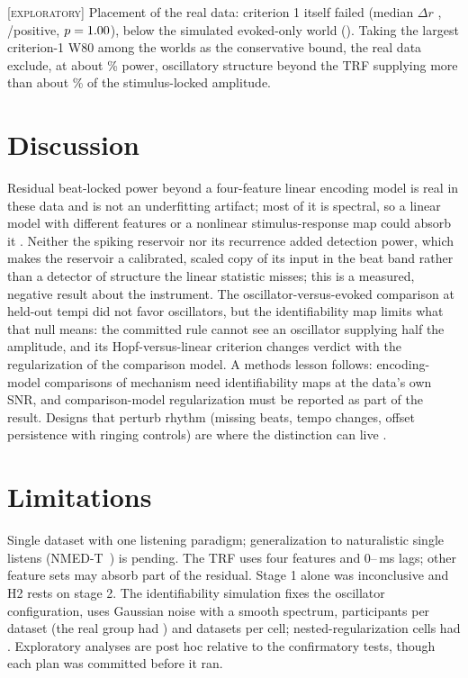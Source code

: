 \documentclass[journal]{IEEEtran}
\newcommand{\Expl}{\textsc{[exploratory]}\xspace}
\begin{document}
\Expl Placement of the real data: criterion 1 itself failed (median $\Delta r$ \NumRealDelta, \NumRealPos/\NumNTwo positive, $p=1.00$), below the simulated evoked-only world (\NumEvokedOnly). Taking the largest criterion-1 W80 among the worlds as the conservative bound, the real data exclude, at about \NumPowerPct\% power, oscillatory structure beyond the TRF supplying more than about \NumTierBPct\% of the stimulus-locked amplitude.

\section{Discussion}
Residual beat-locked power beyond a four-feature linear encoding model is real in these data and is not an underfitting artifact; most of it is spectral, so a linear model with different features or a nonlinear stimulus-response map could absorb it \cite{declercq2022beyond,wilroth2024nonlinearity}. Neither the spiking reservoir nor its recurrence added detection power, which makes the reservoir a calibrated, scaled copy of its input in the beat band rather than a detector of structure the linear statistic misses; this is a measured, negative result about the instrument. The oscillator-versus-evoked comparison at held-out tempi did not favor oscillators, but the identifiability map limits what that null means: the committed rule cannot see an oscillator supplying half the amplitude, and its Hopf-versus-linear criterion changes verdict with the regularization of the comparison model. A methods lesson follows: encoding-model comparisons of mechanism need identifiability maps at the data's own SNR, and comparison-model regularization must be reported as part of the result. Designs that perturb rhythm (missing beats, tempo changes, offset persistence with ringing controls) are where the distinction can live \cite{tal2017neural,vanbree2021sustained,pesnotlerousseau2021frequency}.

\section{Limitations}
Single dataset with one listening paradigm; generalization to naturalistic single listens (NMED-T~\cite{losorelli2017ismir}) is pending. The TRF uses four features and 0--\NumTrfLagMax\,ms lags; other feature sets may absorb part of the residual. Stage 1 alone was inconclusive and H2 rests on stage 2. The identifiability simulation fixes the oscillator configuration, uses Gaussian noise with a smooth spectrum, \NumNSimPart participants per dataset (the real group had \NumNTwo) and \NumNDatasets datasets per cell; nested-regularization cells had \NumNestedDatasets. Exploratory analyses are post hoc relative to the confirmatory tests, though each plan was committed before it ran.
\end{document}
